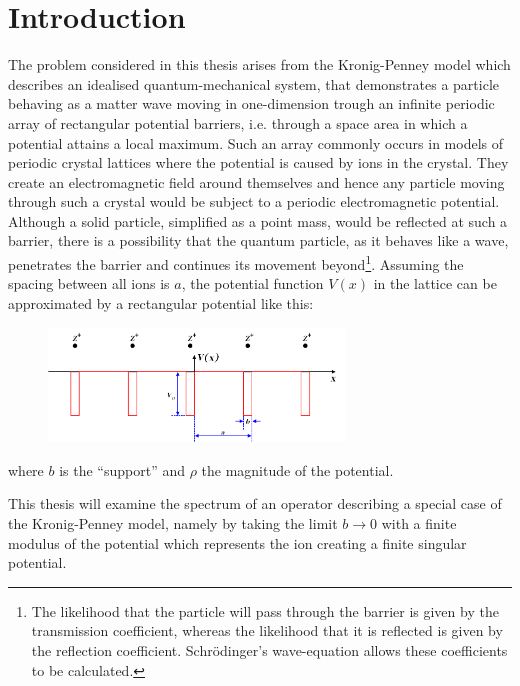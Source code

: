 \chapter{Introduction}

The problem considered in this thesis arises from the Kronig-Penney model which describes an idealised quantum-mechanical system, that demonstrates a particle behaving as a matter wave moving in one-dimension trough an infinite periodic array of rectangular potential barriers, i.e. through a space area in which a potential attains a local maximum. Such an array commonly occurs in models of periodic crystal lattices where the potential is caused by ions in the crystal. They create an electromagnetic field around themselves and hence any particle moving through such a crystal would be subject to a periodic electromagnetic potential. Although a solid particle, simplified as a point mass, would be reflected at such a barrier, there is a possibility that the quantum particle, as it behaves like a wave, penetrates the barrier and continues its movement beyond\footnote{The likelihood that the particle will pass through the barrier is given by the transmission coefficient, whereas the likelihood that it is reflected is given by the reflection coefficient. Schrödinger's wave-equation allows these coefficients to be calculated.}. Assuming the spacing between all ions is $a$, the potential function $V(x)$ in the lattice can be approximated by a rectangular potential like this: %

\begin{figure}[h!] \centering
	  \includegraphics[width=0.7\textwidth]{Periodic_square_potential_130707} %
\end{figure}

where $b$ is the \enquote{support} and $\rho$ the magnitude of the potential.

This thesis will examine the spectrum of an operator describing a special case of the Kronig-Penney model, namely by taking the limit $b \rightarrow 0$ with a finite modulus of the potential which represents the ion creating a finite singular potential. 

